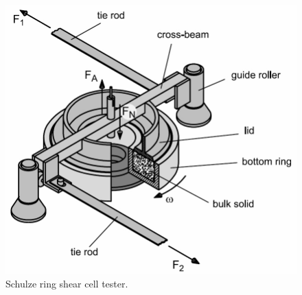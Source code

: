 \begin{figure}[!htb]
\centering
\includegraphics[width=.80\columnwidth]{images/001srsct}
\caption[Schulze ring shear cell tester]{Schulze ring shear cell tester.}
\label{fig:001srsct}
\end{figure}